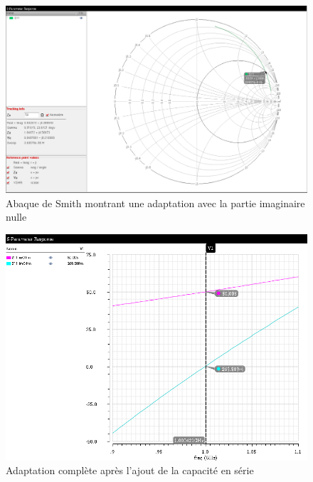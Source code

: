 \documentclass[a4paper]{article}
\begin{document}
\clearpage

\begin{figure}[!htb]
\begin{center}
  \includegraphics[width=\linewidth]{smith-induct-parallele-2nd-adapt.png}
  \caption{Abaque de Smith montrant une adaptation avec la partie imaginaire nulle}
\end{center}
\end{figure}

\begin{figure}[!htb]
\begin{center}
  \includegraphics[scale=0.52]{Z11-2nd-adaptation.png}
  \caption{Adaptation compl\`ete apr\`es l'ajout de la capacit\'e en s\'erie}
\end{center}
\end{figure}

\clearpage
\end{document}
